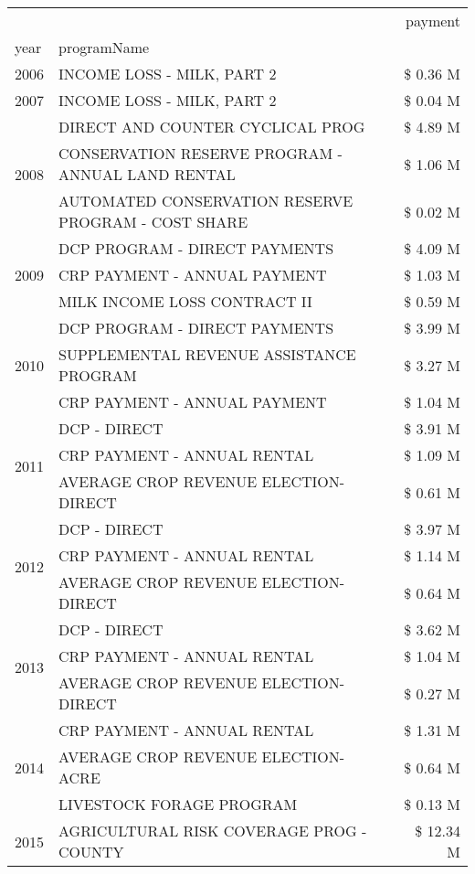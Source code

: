 \begin{tabular}{llr}
\toprule
 &  & payment \\
year & programName &  \\
\midrule
2006 & INCOME LOSS - MILK, PART 2 & \$ 0.36 M \\
\cline{1-3}
2007 & INCOME LOSS - MILK, PART 2 & \$ 0.04 M \\
\cline{1-3}
\multirow[t]{3}{*}{2008} & DIRECT AND COUNTER CYCLICAL PROG & \$ 4.89 M \\
 & CONSERVATION RESERVE PROGRAM - ANNUAL LAND RENTAL & \$ 1.06 M \\
 & AUTOMATED CONSERVATION RESERVE PROGRAM - COST SHARE & \$ 0.02 M \\
\cline{1-3}
\multirow[t]{3}{*}{2009} & DCP PROGRAM - DIRECT PAYMENTS & \$ 4.09 M \\
 & CRP PAYMENT - ANNUAL PAYMENT & \$ 1.03 M \\
 & MILK INCOME LOSS CONTRACT II & \$ 0.59 M \\
\cline{1-3}
\multirow[t]{3}{*}{2010} & DCP PROGRAM - DIRECT PAYMENTS & \$ 3.99 M \\
 & SUPPLEMENTAL REVENUE ASSISTANCE PROGRAM & \$ 3.27 M \\
 & CRP PAYMENT - ANNUAL PAYMENT & \$ 1.04 M \\
\cline{1-3}
\multirow[t]{3}{*}{2011} & DCP - DIRECT & \$ 3.91 M \\
 & CRP PAYMENT - ANNUAL RENTAL & \$ 1.09 M \\
 & AVERAGE CROP REVENUE ELECTION-DIRECT & \$ 0.61 M \\
\cline{1-3}
\multirow[t]{3}{*}{2012} & DCP - DIRECT & \$ 3.97 M \\
 & CRP PAYMENT - ANNUAL RENTAL & \$ 1.14 M \\
 & AVERAGE CROP REVENUE ELECTION-DIRECT & \$ 0.64 M \\
\cline{1-3}
\multirow[t]{3}{*}{2013} & DCP - DIRECT & \$ 3.62 M \\
 & CRP PAYMENT - ANNUAL RENTAL & \$ 1.04 M \\
 & AVERAGE CROP REVENUE ELECTION-DIRECT & \$ 0.27 M \\
\cline{1-3}
\multirow[t]{3}{*}{2014} & CRP PAYMENT - ANNUAL RENTAL & \$ 1.31 M \\
 & AVERAGE CROP REVENUE ELECTION-ACRE & \$ 0.64 M \\
 & LIVESTOCK FORAGE PROGRAM & \$ 0.13 M \\
\cline{1-3}
\multirow[t]{3}{*}{2015} & AGRICULTURAL RISK COVERAGE PROG - COUNTY & \$ 12.34 M \\

\end{tabular}
